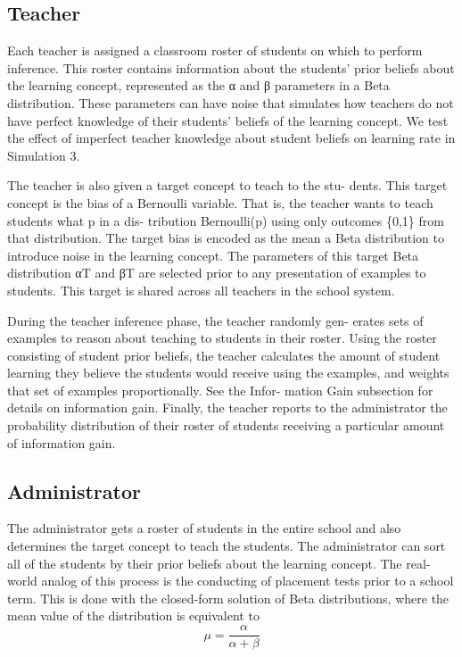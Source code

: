 \documentclass[10pt, letterpaper]{article}
\begin{document}
\subsection{Teacher}\label{teacher}

Each teacher is assigned a classroom roster of students on which to
perform inference. This roster contains information about the students'
prior beliefs about the learning concept, represented as the α and β
parameters in a Beta distribution. These parameters can have noise that
simulates how teachers do not have perfect knowledge of their students'
beliefs of the learning concept. We test the effect of imperfect teacher
knowledge about student beliefs on learning rate in Simulation 3.

The teacher is also given a target concept to teach to the stu- dents.
This target concept is the bias of a Bernoulli variable. That is, the
teacher wants to teach students what p in a dis- tribution Bernoulli(p)
using only outcomes \{0,1\} from that distribution. The target bias is
encoded as the mean a Beta distribution to introduce noise in the
learning concept. The parameters of this target Beta distribution αT and
βT are selected prior to any presentation of examples to students. This
target is shared across all teachers in the school system.

During the teacher inference phase, the teacher randomly gen- erates
sets of examples to reason about teaching to students in their roster.
Using the roster consisting of student prior beliefs, the teacher
calculates the amount of student learning they believe the students
would receive using the examples, and weights that set of examples
proportionally. See the Infor- mation Gain subsection for details on
information gain. Finally, the teacher reports to the administrator the
probability distribution of their roster of students receiving a
particular amount of information gain.

\subsection{Administrator}\label{administrator}

The administrator gets a roster of students in the entire school and
also determines the target concept to teach the students. The
administrator can sort all of the students by their prior beliefs about
the learning concept. The real-world analog of this process is the
conducting of placement tests prior to a school term. This is done with
the closed-form solution of Beta distributions, where the mean value of
the distribution is equivalent to
\[\mu = \frac{\alpha}{\alpha + \beta}\]
\end{document}
